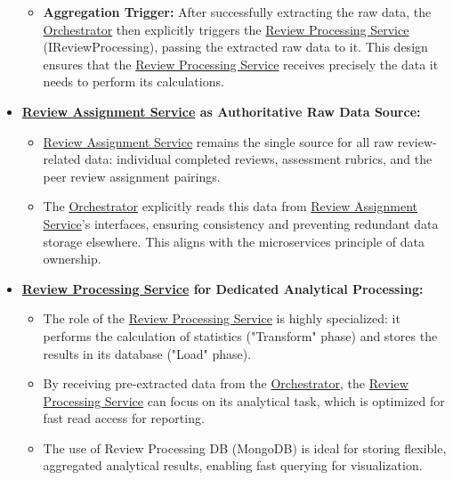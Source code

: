 \begin{itemize}
\begin{itemize}
        \item \textbf{Aggregation Trigger:} After successfully extracting the raw data, the \hyperref[def:Orchestrator]{Orchestrator} then explicitly triggers the \hyperref[def:ReviewProcessingService]{Review Processing Service} (IReviewProcessing), passing the extracted raw data to it. This design ensures that the \hyperref[def:ReviewProcessingService]{Review Processing Service} receives precisely the data it needs to perform its calculations.
    \end{itemize}
    \item \textbf{\hyperref[def:ReviewAssignmentService]{Review Assignment Service} as Authoritative Raw Data Source:}
    \begin{itemize}
        \item \hyperref[def:ReviewAssignmentService]{Review Assignment Service} remains the single source for all raw review-related data: individual completed reviews, assessment rubrics, and the peer review assignment pairings.
        \item The \hyperref[def:Orchestrator]{Orchestrator} explicitly reads this data from \hyperref[def:ReviewAssignmentService]{Review Assignment Service}'s interfaces, ensuring consistency and preventing redundant data storage elsewhere. This aligns with the microservices principle of data ownership.
    \end{itemize}
    \item \textbf{\hyperref[def:ReviewProcessingService]{Review Processing Service} for Dedicated Analytical Processing:}
    \begin{itemize}
        \item The role of the \hyperref[def:ReviewProcessingService]{Review Processing Service} is highly specialized: it performs the calculation of statistics ("Transform" phase) and stores the results in its database ("Load" phase).
        \item By receiving pre-extracted data from the \hyperref[def:Orchestrator]{Orchestrator}, the \hyperref[def:ReviewProcessingService]{Review Processing Service} can focus on its analytical task, which is optimized for fast read access for reporting.
        \item The use of Review Processing DB (MongoDB) is ideal for storing flexible, aggregated analytical results, enabling fast querying for visualization.
    \end{itemize}
\end{itemize}